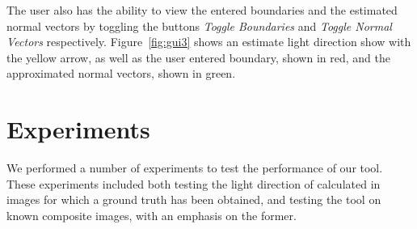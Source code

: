 \documentclass[10pt,twocolumn,letterpaper]{article}
\begin{document}
The user also has the ability to view the entered boundaries and the estimated normal vectors by toggling the buttons \emph{Toggle Boundaries} and \emph{Toggle Normal Vectors} respectively. Figure~\ref{fig:gui3} shows an estimate light direction show with the yellow arrow, as well as the user entered boundary, shown in red, and the approximated normal vectors, shown in green.


\section{Experiments}
We performed a number of experiments to test the performance of our tool. These experiments included both testing the light direction of calculated in images for which a ground truth has been obtained, and testing the tool on known composite images, with an emphasis on the former.
%
\end{document}
